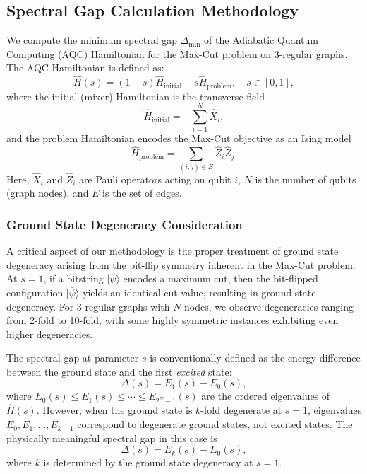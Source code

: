 
\subsection{Spectral Gap Calculation Methodology}

We compute the minimum spectral gap $\Delta_{\text{min}}$ of the Adiabatic Quantum Computing (AQC) Hamiltonian for the Max-Cut problem on 3-regular graphs. The AQC Hamiltonian is defined as:
%
\begin{equation}
    \hat{H}(s) = (1-s)\hat{H}_{\text{initial}} + s\hat{H}_{\text{problem}}, \quad s \in [0,1],
\end{equation}
%
where the initial (mixer) Hamiltonian is the transverse field
%
\begin{equation}
    \hat{H}_{\text{initial}} = -\sum_{i=1}^{N} \hat{X}_i,
\end{equation}
%
and the problem Hamiltonian encodes the Max-Cut objective as an Ising model
%
\begin{equation}
    \hat{H}_{\text{problem}} = \sum_{(i,j) \in E} \hat{Z}_i \hat{Z}_j.
\end{equation}
%
Here, $\hat{X}_i$ and $\hat{Z}_i$ are Pauli operators acting on qubit $i$, $N$ is the number of qubits (graph nodes), and $E$ is the set of edges.

\subsubsection{Ground State Degeneracy Consideration}

A critical aspect of our methodology is the proper treatment of ground state degeneracy arising from the bit-flip symmetry inherent in the Max-Cut problem. At $s=1$, if a bitstring $|\psi\rangle$ encodes a maximum cut, then the bit-flipped configuration $|\bar{\psi}\rangle$ yields an identical cut value, resulting in ground state degeneracy. For 3-regular graphs with $N$ nodes, we observe degeneracies ranging from 2-fold to 10-fold, with some highly symmetric instances exhibiting even higher degeneracies.

The spectral gap at parameter $s$ is conventionally defined as the energy difference between the ground state and the first \emph{excited} state:
%
\begin{equation}
    \Delta(s) = E_1(s) - E_0(s),
\end{equation}
%
where $E_0(s) \leq E_1(s) \leq \cdots \leq E_{2^N-1}(s)$ are the ordered eigenvalues of $\hat{H}(s)$. However, when the ground state is $k$-fold degenerate at $s=1$, eigenvalues $E_0, E_1, \ldots, E_{k-1}$ correspond to degenerate ground states, not excited states. The physically meaningful spectral gap in this case is
%
\begin{equation}
    \Delta(s) = E_k(s) - E_0(s),
\end{equation}
%
where $k$ is determined by the ground state degeneracy at $s=1$.

